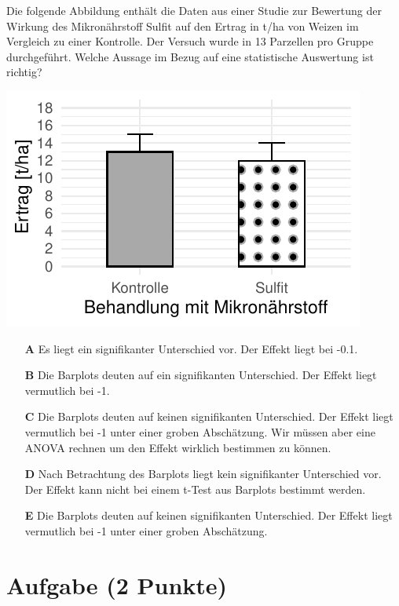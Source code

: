 \documentclass[a4paper, 9pt]{scrartcl}\usepackage[]{graphicx}\usepackage[]{xcolor}
\makeatletter
\def\maxwidth{ %
  \ifdim\Gin@nat@width>\linewidth
    \linewidth
  \else
    \Gin@nat@width
  \fi
}
\makeatother
\begin{document}
Die folgende Abbildung enthält die Daten aus einer Studie zur Bewertung der Wirkung des Mikronährstoff Sulfit auf den Ertrag in t/ha von Weizen im Vergleich zu einer Kontrolle. Der Versuch wurde in 13 Parzellen pro Gruppe durchgeführt. Welche Aussage im Bezug auf eine statistische Auswertung ist richtig?



{\centering \includegraphics[width=\maxwidth]{img/mc-testing-ttest-02-1} 

}







\begin{enumerate}
\item [\textbf{A} \msquare] Es liegt ein signifikanter Unterschied vor. Der Effekt liegt bei -0.1.
\item [\textbf{B} \msquare] Die Barplots deuten auf ein signifikanten Unterschied. Der Effekt liegt vermutlich bei -1.
\item [\textbf{C} \msquare] Die Barplots deuten auf keinen signifikanten Unterschied. Der Effekt liegt vermutlich bei -1 unter einer groben Abschätzung. Wir müssen aber eine ANOVA rechnen um den Effekt wirklich bestimmen zu können.
\item [\textbf{D} \msquare] Nach Betrachtung des Barplots liegt kein signifikanter Unterschied vor. Der Effekt kann nicht bei einem t-Test aus Barplots bestimmt werden.
\item [\textbf{E} \msquare] Die Barplots deuten auf keinen signifikanten Unterschied. Der Effekt liegt vermutlich bei -1 unter einer groben Abschätzung.
\end{enumerate}

\section{Aufgabe \hfill (2 Punkte)}
\end{document}
